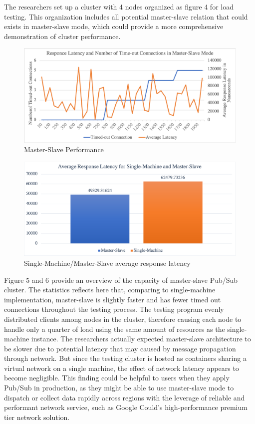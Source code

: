 The researchers set up a cluster with 4 nodes organized as figure 4 for load testing. This organization includes all potential master-slave relation that could exists in master-slave mode, which could provide a more comprehensive demonstration of cluster performance.
	
\begin{figure}[H]
	\centering
	\includegraphics[scale=0.33]{figure/master-slave/performance.png}
	\caption{Master-Slave Performance}
\end{figure}

\begin{figure}[H]
	\centering
	\includegraphics[scale=0.33]{figure/master-slave/response-latency.png}
	\caption{Single-Machine/Master-Slave average response latency}
\end{figure}

Figure 5 and 6 provide an overview of the capacity of master-slave Pub/Sub cluster. The statistics reflects here that, comparing to single-machine implementation, master-slave is slightly faster and has fewer timed out connections throughout the testing process. The testing program evenly distributed clients among nodes in the cluster, therefore causing each node  to handle only a quarter of load using the same amount of resources as the single-machine instance. The researchers actually expected master-slave architecture to be slower due to potential latency that may caused by message propagation through network. But since the testing cluster is hosted as containers sharing a virtual network on a single machine, the effect of network latency appears to become negligible. This finding could be helpful to users when they apply Pub/Sub in production, as they might be able to use master-slave mode to dispatch or collect data rapidly across regions with the leverage of reliable and performant network service, such as Google Could's high-performance premium tier network solution\citep{google-cloud-network}.

